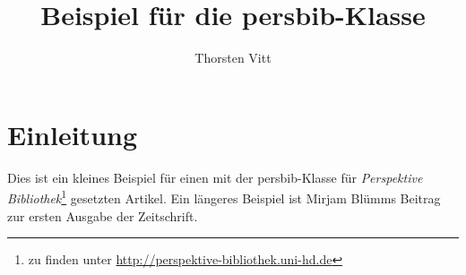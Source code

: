 \documentclass[ngerman,german]{persbib}
\title{Beispiel für die \textsf{persbib}-Klasse}
\author{Thorsten Vitt}
\begin{document}
\maketitle

\section{Einleitung}
\label{sec:einleitung}

Dies ist ein kleines Beispiel für einen mit der
\textsf{persbib}-Klasse für \emph{Perspektive Bibliothek}\footnote{%
  zu finden unter \url{http://perspektive-bibliothek.uni-hd.de}}
gesetzten Artikel.  Ein längeres Beispiel ist Mirjam Blümms
Beitrag\autocite{Bluemm2012} zur ersten Ausgabe der Zeitschrift.

\clearpage
\printbibliography
\end{document}
